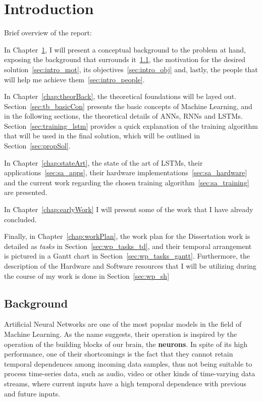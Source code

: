\chapter{Introduction}\label{chap:intro}
Brief overview of the report:

In Chapter~\ref{chap:intro}, I will present a conceptual background to the problem at hand, exposing the background that surrounds it~\ref{sec:intro_back}, the motivation for the desired solution~\ref{sec:intro_mot}, its objectives~\ref{sec:intro_obj} and, lastly, the people that will help me achieve them~\ref{sec:intro_people}.

In Chapter~\ref{chap:theorBack}, the theoretical foundations will be layed out. Section~\ref{sec:tb_basicCon} presents the basic concepts of Machine Learning, and in the following sections, the theoretical details of ANNs, RNNs and LSTMs. Section~\ref{sec:training_lstm} provides a quick explanation of the training algorithm that will be used in the final solution, which will be outlined in Section~\ref{sec:propSol}.

In Chapter~\ref{chap:stateArt}, the state of the art of LSTMs, their applications~\ref{sec:sa_apps}, their hardware implementations~\ref{sec:sa_hardware} and the current work regarding the chosen training algorithm~\ref{sec:sa_training} are presented.

In Chapter~\ref{chap:earlyWork} I will present some of the work that I have already concluded.

Finally, in Chapter~\ref{chap:workPlan}, the work plan for the Dissertation work is detailed as \emph{tasks} in Section~\ref{sec:wp_tasks_td}, and their temporal arrangement is pictured in a Gantt chart in Section~\ref{sec:wp_tasks_gantt}. Furthermore, the description of the Hardware and Software resources that I will be utilizing during the course of my work is done in Section~\ref{sec:wp_sh}



\section{Background}\label{sec:intro_back}
Artificial Neural Networks are one of the most popular models in the field of Machine Learning. As the name suggests, their operation is inspired by the operation of the building blocks of our brain, the \textbf{neurons}. In spite of its high performance, one of their shortcomings is the fact that they cannot retain temporal dependences among incoming data samples, thus not being suitable to process time-series data, such as audio, video or other kinds of time-varying data streams, where current inputs have a high temporal dependence with previous and future inputs. 

